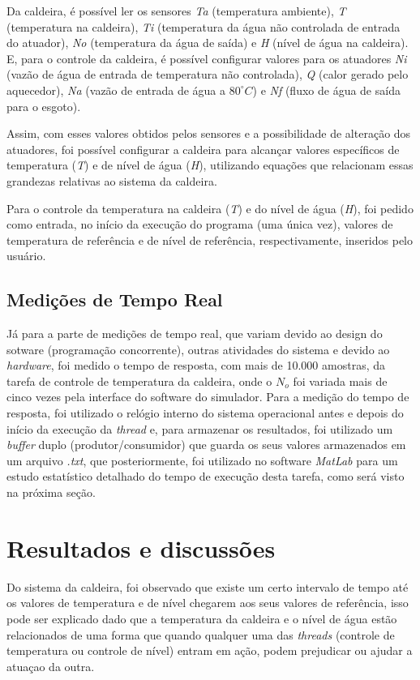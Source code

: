 \documentclass[journal]{IEEEtran}
\begin{document}
Da caldeira, é possível ler os sensores \textit{Ta} (temperatura ambiente), \textit{T} (temperatura na caldeira),
\textit{Ti} (temperatura da água não controlada de entrada do atuador), \textit{No} (temperatura da água de saída) e
\textit{H} (nível de água na caldeira). E, para o controle da caldeira, é possível configurar valores
para os atuadores \textit{Ni} (vazão de água de entrada de temperatura não controlada),
\textit{Q} (calor gerado pelo aquecedor), \textit{Na} (vazão de entrada de água a $80 ^{\circ} C$) e
\textit{Nf} (fluxo de água de saída para o esgoto).

Assim, com esses valores obtidos pelos sensores e a possibilidade de alteração dos atuadores,
foi possível configurar a caldeira para alcançar valores específicos de temperatura (\textit{T}) e de
nível de água (\textit{H}), utilizando equações que relacionam essas grandezas relativas ao sistema da caldeira.

Para o controle da temperatura na caldeira (\textit{T}) e do nível de água (\textit{H}), foi pedido como
entrada, no início da execução do programa (uma única vez), valores de temperatura de referência e de
nível de referência, respectivamente, inseridos pelo usuário.


\subsection{Medições de Tempo Real}
Já para a parte de medições de tempo real, que variam devido ao design do sotware (programação concorrente),
outras atividades do sistema e devido ao \textit{hardware}, foi medido o tempo de resposta, com mais de 10.000
amostras, da tarefa de controle de temperatura da caldeira, onde o $N_o$ foi variada mais de cinco vezes pela
interface do software do simulador. Para a medição do tempo de resposta, foi utilizado o relógio interno do
sistema operacional antes e depois do início da execução da \textit{thread} e, para armazenar os resultados,
foi utilizado um \textit{buffer} duplo (produtor/consumidor) que guarda os seus valores armazenados em um
arquivo \textit{.txt}, que posteriormente, foi utilizado no software \textit{MatLab} para um estudo
estatístico detalhado do tempo de execução desta tarefa, como será visto na próxima seção.

\section{Resultados e discussões}
Do sistema da caldeira, foi observado que existe um certo intervalo de tempo até os valores de temperatura
e de nível chegarem aos seus valores de referência, isso pode ser explicado dado que a temperatura da caldeira e o nível de água estão relacionados de
uma forma que quando qualquer uma das \textit{threads} (controle de temperatura ou controle de nível) entram
em ação, podem prejudicar ou ajudar a atuaçao da outra.
\end{document}
